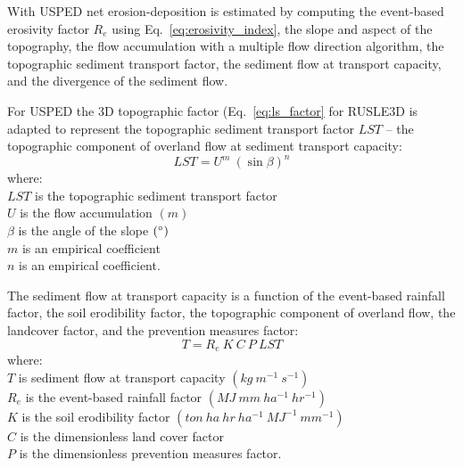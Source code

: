 \documentclass[esurf, manuscript]{copernicus}
\begin{document}
With USPED net erosion-deposition is estimated by computing
the event-based erosivity factor $R_e$ using Eq.~\ref{eq:erosivity_index},
the slope and aspect of the topography,
the flow accumulation with a multiple flow direction algorithm,
the topographic sediment transport factor,
the sediment flow at transport capacity,
and the divergence of the sediment flow. 

For USPED
the 3D topographic factor (Eq.~\ref{eq:ls_factor} for RUSLE3D 
is adapted to represent the topographic sediment transport factor $LST$ --
the topographic component 
of overland flow at sediment transport capacity:
%
\begin{equation}
\label{eq:lst_factor}
{LST = U^{m} ~ (\sin \beta)^{n}}
\end{equation}
%
{\small
\noindent
where: \\
\noindent
\hspace*{0.5em} $LST$ is the topographic sediment transport factor\\
\hspace*{0.5em} $U$ is the flow accumulation $(m)$\\
\hspace*{0.5em} $\beta$ is the angle of the slope $(^{\circ})$\\
\hspace*{0.5em} $m$ is an empirical coefficient\\
\hspace*{0.5em} $n$ is an empirical coefficient.\\
}

The sediment flow at transport capacity is a function of 
the event-based rainfall factor, the soil erodibility factor, 
the topographic component of overland flow,
the landcover factor, and the prevention measures factor:
%
\begin{equation}
\label{eq:usped}
{T = R_e ~ K ~ C ~ P ~ LST}
\end{equation}
{\small
\noindent
where: \\
\noindent
\hspace*{0.5em} $T$ is sediment flow at transport capacity $(kg ~ m^{-1} ~ s^{-1})$\\ 
\hspace*{0.5em} $R_e$ is the event-based rainfall factor $(MJ ~ mm ~ ha^{-1} ~ hr^{-1})$\\
\hspace*{0.5em} $K$ is the soil erodibility factor $(ton ~ ha ~ hr ~ ha^{-1} ~ MJ^{-1} ~ mm^{-1})$\\ 
\hspace*{0.5em} $C$ is the dimensionless land cover factor\\
\hspace*{0.5em} $P$ is the dimensionless prevention measures factor.\\
}
\end{document}
